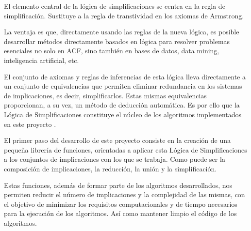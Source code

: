 El elemento central de la l\'ogica de simplificaciones se centra en la regla de simplificaci\'on. Sustituye a la regla de transtividad en los axiomas de Armstrong.

La ventaja es que, directamente usando las reglas de la nueva l\'ogica, es posible desarrollar m\'etodos directamente basados en l\'ogica para resolver problemas esenciales no solo en ACF, sino tambi\'en en bases de datos, data mining, inteligencia artificial, etc. 

El conjunto de axiomas y reglas de inferencias de esta l\'ogica lleva directamente a un conjunto de equivalencias que permiten eliminar redundancia en los sistemas de implicaciones, es decir, simplificarlos. Estas mismas equivalencias proporcionan, a su vez, un m\'etodo de deducci\'on autom\'atica. Es por ello que la L\'ogica de Simplificaciones constituye el n\'ucleo de los algoritmos implementados en este proyecto \cite{Cordero2002}\cite{dbasisslfd}\cite{Reduction}\cite{do}.

El primer paso del desarrollo de este proyecto consiste en la creaci\'on de una peque\~na librer\'ia de funciones,
orientadas a aplicar esta L\'ogica de Simplificaciones a los conjuntos de implicaciones con los que se trabaja. Como 
puede ser la composici\'on de implicaciones, la reducci\'on, la uni\'on y la simplificaci\'on.

Estas funciones, adem\'as de formar parte de los algoritmos desarrollados, nos permiten reducir el n\'umero de 
implicaciones y la complejidad de las mismas, con el objetivo de minimizar los requisitos computacionales y de tiempo
necesarios para la ejecuci\'on de los algoritmos. As\'i como mantener limpio el c\'odigo de los algoritmos.







